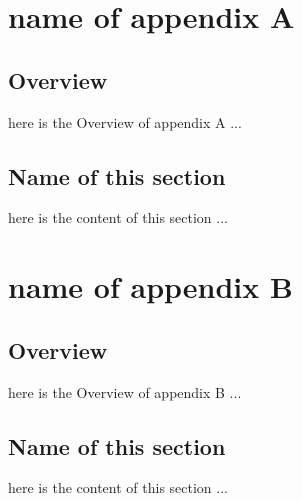 \documentclass[a4paper,twoside,phd]{BYUPhys}
\begin{document}

\appendix
\chapter{name of appendix A}
\section{Overview}
here is the Overview of appendix A ...
\section{Name of this section}
here is the content of this section ...
\chapter{name of appendix B}
\section{Overview}
here is the Overview of appendix B ...
\section{Name of this section}
here is the content of this section ...

%

%

%
\end{document}
